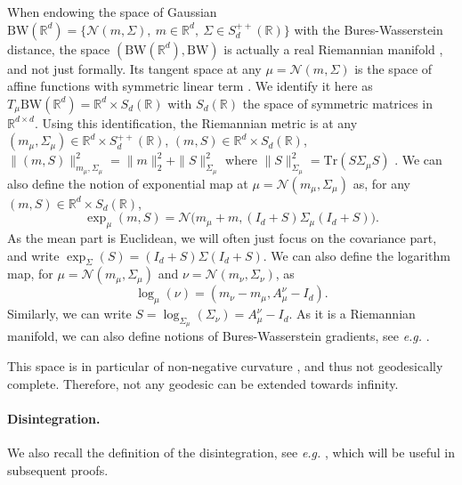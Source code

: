 \documentclass[twoside]{article}
\newcommand{\cN}{\mathcal{N}}
\newcommand{\R}{\mathbb{R}}
\newcommand{\tr}{\mathrm{Tr}}
\newcommand{\bw}{\mathrm{BW}}
\begin{document}
When endowing the space of Gaussian $\bw(\R^d)=\{\cN(m,\Sigma),\ m\in \R^d,\ \Sigma\in S_d^{++}(\R)\}$ with the Bures-Wasserstein distance, the space $(\bw(\R^d), \bw)$ is actually a real Riemannian manifold \citep{bhatia2019bures}, and not just formally. Its tangent space at any $\mu=\cN(m,\Sigma)$ is the space of affine functions with symmetric linear term \citep[Appendix A.1]{diao2023forward}. We identify it here as $T_\mu\bw(\R^d) = \R^d \times S_d(\R)$ with $S_d(\R)$ the space of symmetric matrices in $\R^{d\times d}$. Using this identification, the Riemannian metric is at any $(m_\mu,\Sigma_\mu)\in\R^d\times S_d^{++}(\R)$, $(m,S)\in \R^d\times S_d(\R)$, $\|(m,S)\|_{m_\mu,\Sigma_\mu}^2 = \|m\|_2^2 + \|S\|_{\Sigma_\mu}^2$ where $\|S\|_{\Sigma_\mu}^2 = \tr(S\Sigma_\mu S)$ \citep{takatsu2011wasserstein}. We can also define the notion of exponential map at $\mu=\cN(m_\mu,\Sigma_\mu)$ as, for any $(m, S)\in \R^d\times S_d(\R)$,
\begin{equation}
    \exp_{\mu}(m, S) = \cN\big(m_\mu + m, (I_d + S)\Sigma_\mu(I_d + S)\big).
\end{equation}
As the mean part is Euclidean, we will often just focus on the covariance part, and write $\exp_\Sigma(S)=(I_d + S)\Sigma(I_d + S)$. We can also define the logarithm map, for $\mu=\cN(m_\mu,\Sigma_\mu)$ and $\nu=\cN(m_\nu,\Sigma_\nu)$, as
\begin{equation}
    \log_\mu(\nu) = (m_\nu-m_\mu, A_\mu^\nu - I_d).
\end{equation}
Similarly, we can write $S=\log_{\Sigma_{\mu}}(\Sigma_\nu)=A_\mu^\nu - I_d$. As it is a Riemannian manifold, we can also define notions of Bures-Wasserstein gradients, see \emph{e.g.} \citep{lambert2022variational, diao2023forward}.

This space is in particular of non-negative curvature \citep{takatsu2011wasserstein}, and thus not geodesically complete. Therefore, not any geodesic can be extended towards infinity.








\paragraph{Disintegration.}

We also recall the definition of the disintegration, see \emph{e.g.} \citep[Theorem 5.3.1]{ambrosio2008gradient}, which will be useful in subsequent proofs.
\end{document}
